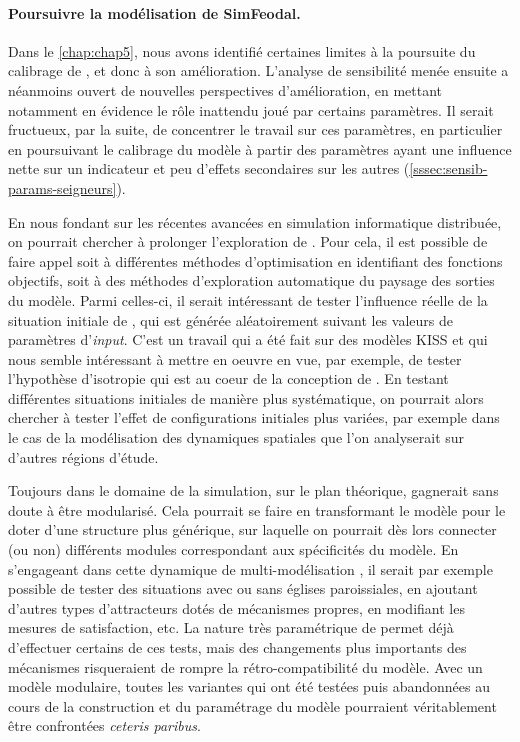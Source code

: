 \paragraph{Poursuivre la modélisation de SimFeodal.}
Dans le \cref{chap:chap5}, nous avons identifié certaines limites à la poursuite du calibrage de \simfeodal{}, et donc à son amélioration.
L'analyse de sensibilité menée ensuite a néanmoins ouvert de nouvelles perspectives d'amélioration, en mettant notamment en évidence le rôle inattendu joué par certains paramètres.
Il serait fructueux, par la suite, de concentrer le travail sur ces paramètres, en particulier en poursuivant le calibrage du modèle à partir des paramètres ayant une influence nette sur un indicateur et peu d'effets secondaires sur les autres (\cref{sssec:sensib-params-seigneurs}). 

En nous fondant sur les récentes avancées en simulation informatique distribuée, on pourrait chercher à prolonger l'exploration de \simfeodal{}.
Pour cela, il est possible de faire appel soit à différentes méthodes d'optimisation en identifiant des \og fonctions objectifs\fg{}, soit à des méthodes d'exploration automatique du paysage des sorties du modèle.
Parmi celles-ci, il serait intéressant de tester l'influence réelle de la situation initiale de \simfeodal{}, qui est générée aléatoirement suivant les valeurs de paramètres d'\textit{input}.
C'est un travail qui a été fait sur des modèles KISS \autocite{raimbault_space_2019} et qui nous semble intéressant à mettre en oeuvre en vue, par exemple, de tester l'hypothèse d'isotropie qui est au coeur de la conception de \simfeodal{}.
En testant différentes situations initiales de manière plus systématique, on pourrait alors chercher à tester l'effet de configurations initiales plus variées, par exemple dans le cas de la modélisation des dynamiques spatiales que l'on analyserait sur d'autres régions d'étude.

Toujours dans le domaine de la simulation, sur le plan théorique, \simfeodal{} gagnerait sans doute à être \og modularisé\fg{}.
Cela pourrait se faire en transformant le modèle pour le doter d'une structure plus générique, sur laquelle on pourrait dès lors connecter (ou non) différents \og modules\fg{} correspondant aux spécificités du modèle.
En s'engageant dans cette dynamique de multi-modélisation \autocite{cottineau_chapter_2019}, il serait par exemple possible de tester des situations avec ou sans églises paroissiales, en ajoutant d'autres types d'attracteurs dotés de mécanismes propres, en modifiant les mesures de satisfaction, etc.
La nature très paramétrique de \simfeodal{} permet déjà d'effectuer certains de ces tests, mais des changements plus importants des mécanismes risqueraient de rompre la rétro-compatibilité du modèle.
Avec un modèle modulaire, toutes les variantes qui ont été testées puis abandonnées au cours de la construction et du paramétrage du modèle pourraient véritablement être confrontées \textit{ceteris paribus}.

